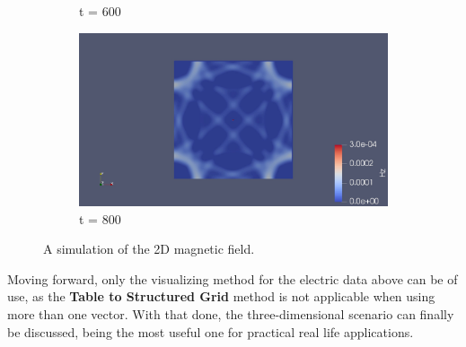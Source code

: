 \begin{figure}[h!]
\begin{subfigure}{.49\textwidth}
		\caption{t = 600}
	\end{subfigure}
	\begin{subfigure}{.49\textwidth}
		\centering
		\includegraphics[width=.95\linewidth]{Figures/FDTD2DH4}
		\caption{t = 800}
	\end{subfigure}
	\decoRule
	\caption[2D Magnetic Field Simulation]{A simulation of the 2D magnetic field.}
	\label{fig:FDTD2DH}
\end{figure}

Moving forward, only the visualizing method for the electric data above can be of use, as the \textbf{Table to Structured Grid} method is not applicable when using more than one vector. With that done, the three-dimensional scenario can finally be discussed, being the most useful one for practical real life applications.